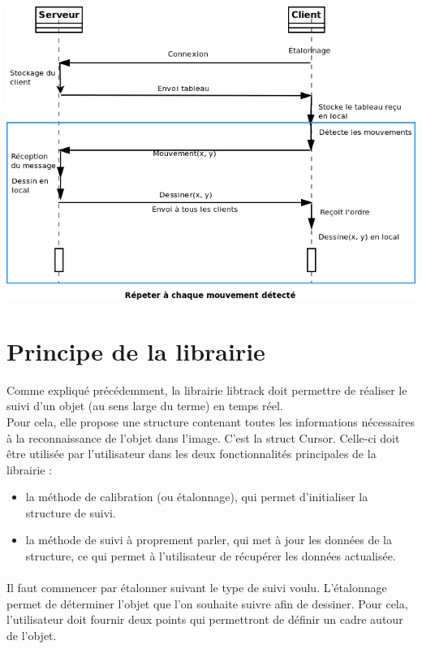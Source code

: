 \documentclass{article}
\begin{document}
\begin{center}
	\includegraphics[scale=0.5]{../uml/sequence_reseau.png}
\end{center}

\section{Principe de la librairie}
Comme expliqué précédemment, la librairie libtrack doit permettre de réaliser le suivi d'un objet (au sens large du terme) en temps réel.\\
Pour cela, elle propose une structure contenant toutes les informations nécessaires à la reconnaissance de l'objet dans l'image. C'est la struct Cursor.
Celle-ci doit être utilisée par l'utilisateur dans les deux fonctionnalités principales de la librairie : \begin{itemize}
\item la méthode de calibration (ou étalonnage), qui permet d'initialiser la structure de suivi.
\item la méthode de suivi à proprement parler, qui met à jour les données de la structure, ce qui permet à l'utilisateur de récupérer les données actualisée.
\end{itemize}

\paragraph{}
Il faut commencer par étalonner suivant le type de suivi voulu.
L'étalonnage permet de déterminer l'objet que l'on souhaite suivre afin de dessiner. Pour cela, l'utilisateur doit fournir deux points qui permettront de définir un cadre autour de l'objet.
\end{document}
